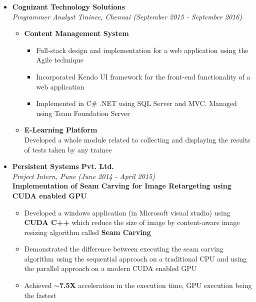 \documentclass[a4paper,10pt]{article}
\newcommand{\isep}{-2 pt}
\begin{document}
\begin{itemize}
    \item \textbf{Cognizant Technology Solutions}\\
    \emph{Programmer Analyst Trainee, Chennai 
    \hfill (September 2015 - September 2016)}
    \\ [-0.6cm]
    \begin{itemize}\itemsep \isep
    \item \textbf{Content Management System}
        \begin{itemize}
            \item Full-stack design and implementation for a web application using the Agile technique
            \item Incorporated Kendo UI framework for the front-end functionality of a web application
            \item Implemented in C\# .NET using SQL Server and MVC. Managed using Team Foundation Server
        \end{itemize}
    \item \textbf{E-Learning Platform}\\
    Developed a whole module related to collecting and displaying the results of tests taken by any trainee
    \end{itemize}
    
    \item \textbf{Persistent Systems Pvt. Ltd.} \\
    \emph{Project Intern, Pune} \hfill {\emph{(June 2014 - April 2015)}}\\
    \textbf{Implementation of Seam Carving for Image Retargeting using CUDA enabled GPU}\\ [-0.6cm]
    \begin{itemize}\itemsep \isep
    \item Developed a windows application (in Microsoft visual studio) using \textbf{CUDA C++} which reduce the size of image by content-aware image resizing algorithm called \textbf{Seam Carving}
    \item Demonstrated the difference between executing the seam carving algorithm using the sequential approach on a traditional CPU and using the parallel approach on a modern CUDA enabled GPU
    \item Achieved \textbf{$\sim$7.5X} acceleration in the execution time, GPU execution being the fastest
    \end{itemize}
\end{itemize}
\end{document}
